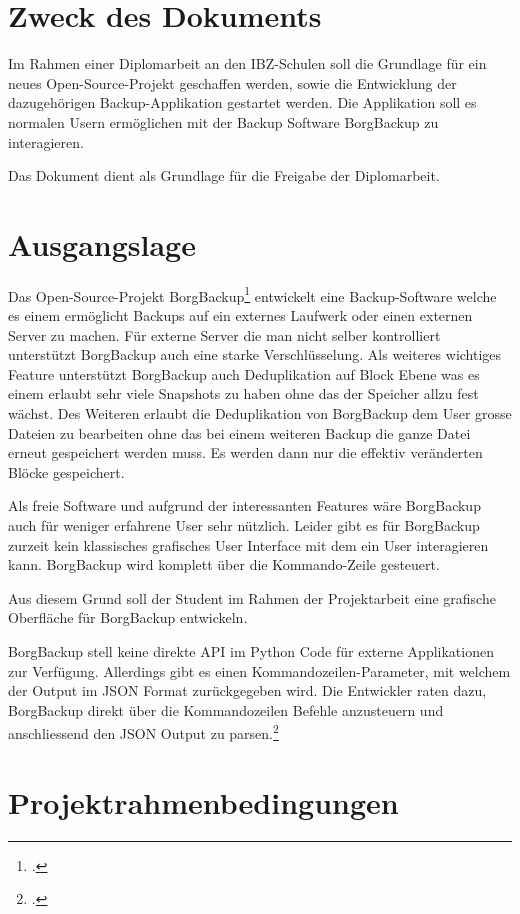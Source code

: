 
\section{Zweck des Dokuments}
\label{sec:orgf75a1ef}
Im Rahmen einer Diplomarbeit an den IBZ-Schulen soll die Grundlage für ein neues
Open-Source-Projekt geschaffen werden, sowie die Entwicklung der dazugehörigen
Backup-Applikation gestartet werden. Die Applikation soll es normalen Usern
ermöglichen mit der Backup Software BorgBackup zu interagieren.

Das Dokument dient als Grundlage für die Freigabe der Diplomarbeit.

\section{Ausgangslage}
\label{sec:org099face}
Das Open-Source-Projekt BorgBackup\footcite{borgbackup} entwickelt eine
Backup-Software welche es einem ermöglicht Backups auf ein externes Laufwerk
oder einen externen Server zu machen. Für externe Server die man nicht selber
kontrolliert unterstützt BorgBackup auch eine starke Verschlüsselung. Als
weiteres wichtiges Feature unterstützt BorgBackup auch Deduplikation auf Block
Ebene was es einem erlaubt sehr viele Snapshots zu haben ohne das der Speicher
allzu fest wächst. Des Weiteren erlaubt die Deduplikation von BorgBackup dem
User grosse Dateien zu bearbeiten ohne das bei einem weiteren Backup die ganze
Datei erneut gespeichert werden muss. Es werden dann nur die effektiv
veränderten Blöcke gespeichert.

Als freie Software und aufgrund der interessanten Features wäre BorgBackup auch
für weniger erfahrene User sehr nützlich. Leider gibt es für BorgBackup zurzeit
kein klassisches grafisches User Interface mit dem ein User interagieren kann.
BorgBackup wird komplett über die Kommando-Zeile gesteuert.

Aus diesem Grund soll der Student im Rahmen der Projektarbeit eine grafische
Oberfläche für BorgBackup entwickeln.

BorgBackup stell keine direkte API im Python Code für externe Applikationen zur
Verfügung. Allerdings gibt es einen Kommandozeilen-Parameter, mit welchem der
Output im JSON Format zurückgegeben wird. Die Entwickler raten dazu, BorgBackup
direkt über die Kommandozeilen Befehle anzusteuern und anschliessend den JSON
Output zu parsen.\footcite{jsonapi}

\section{Projektrahmenbedingungen}
\label{sec:org3cb682f}

